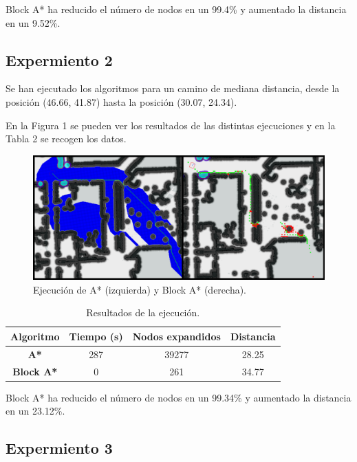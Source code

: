 \documentclass[11pt,spanish]{article} %
\begin{document}
Block A* ha reducido el número de nodos en un 99.4\% y aumentado la distancia en un 9.52\%.

\subsection{Expermiento 2}

Se han ejecutado los algoritmos para un camino de mediana distancia, desde la posición (46.66, 41.87) hasta la posición (30.07, 24.34).

En la Figura 1 se pueden ver los resultados de las distintas ejecuciones y en la Tabla 2 se recogen los datos.

\begin{figure}[H]
  \begin{center}
  \includegraphics[scale=.26]{2_a}
  \caption{Ejecución de A* (izquierda) y Block A* (derecha).}
  \end{center}
\end{figure}

\begin{table}[H]
\begin{center}
 \begin{tabular}{|c|c|c|c|} 
 \hline
 \rule{0cm}{0.5cm}
 \textbf{Algoritmo} & \textbf{Tiempo (s)} & \textbf{Nodos expandidos} & \textbf{Distancia} \\
 \hline\hline
 \textbf{A*}       & 287 & 39277 & 28.25 \\ 
 \hline
 \textbf{Block A*} & 0 & 261 & 34.77 \\
 \hline
\end{tabular}
\caption{Resultados de la ejecución.}
\end{center}
\end{table}

Block A* ha reducido el número de nodos en un 99.34\% y aumentado la distancia en un 23.12\%.

\subsection{Expermiento 3}
\end{document}

